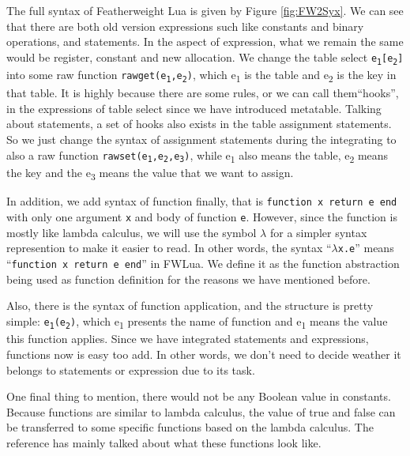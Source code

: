 The full syntax of Featherweight Lua is given by Figure \ref{fig:FW2Syx}. We can see that there are both old version expressions such like constants and binary operations, and statements. In the aspect of expression, what we remain the same would be register, constant and new allocation. We change the table select {\tt e\textsubscript{1}[e\textsubscript{2}]} into some raw function {\tt rawget(e\textsubscript{1},e\textsubscript{2})}, which e\textsubscript{1} is the table and e\textsubscript{2} is the key in that table. It is highly because there are some rules, or we can call them``hooks'', in the expressions of table select since we have introduced metatable. Talking about statements, a set of hooks also exists in the table assignment statements. So we just change the syntax of assignment statements during the integrating to also a raw function {\tt rawset(e\textsubscript{1},e\textsubscript{2},e\textsubscript{3})}, while e\textsubscript{1} also means the table, e\textsubscript{2} means the key and the e\textsubscript{3} means the value that we want to assign. 

In addition, we add syntax of function finally, that is {\tt function x return e end} with only one argument {\tt x} and body of function {\tt e}. However, since the function is mostly like lambda calculus, we will use the symbol $\lambda$ for a simpler syntax represention to make it easier to read. In other words, the syntax ``{\tt $\lambda$x.e}'' means ``{\tt function x return e end}'' in FWLua. We define it as the function abstraction being used as function definition for the reasons we have mentioned before. 

Also, there is the syntax of function application, and the structure is pretty simple: {\tt e\textsubscript{1}(e\textsubscript{2})}, which e\textsubscript{1} presents the name of function and e\textsubscript{1} means the value this function applies. Since we have integrated statements and expressions, functions now is easy too add. In other words, we don't need to decide weather it belongs to statements or expression due to its task.

One final thing to mention, there would not be any Boolean value in constants. Because functions are similar to lambda calculus, the value of true and false can be transferred to some specific functions based on the lambda calculus. The reference\cite{LC} has mainly talked about what these functions look like.


